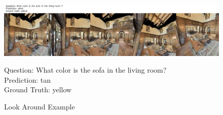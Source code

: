 \begin{figure}[H]
	\centering
	\includegraphics[width=\textwidth]{./figure/lookaroundexample.jpg}
	\captionsetup{justification=raggedright, textfont=footnotesize}
	\caption*{Question: What color is the sofa in the living room? \\
	Prediction: tan \\
	Ground Truth: yellow}
    \captionsetup{labelfont=bf, textfont=normal,
			justification=centering,
			singlelinecheck=false}
	\caption{Look Around Example}
	\label{fig:look_around}
\end{figure}


